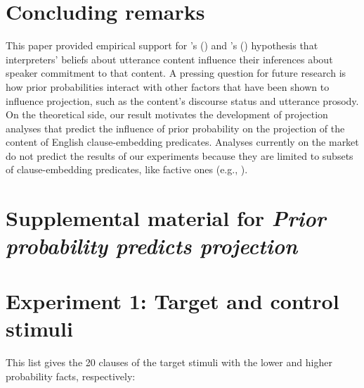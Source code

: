 \documentclass[11pt,fleqn]{article}
\newcommand{\6}{\mbox{$[\hspace*{-.6mm}[$}}
\newcommand{\9}{\mbox{$]\hspace*{-.6mm}]$}}
\newcommand{\citetpos}[1]{\citeauthor{#1}'s (\citeyear{#1})}
\begin{document}
\section{Concluding remarks}\label{s4}

This paper provided empirical support for \citetpos{stevens-etal2017} and \citetpos{tbd-variability} hypothesis that interpreters' beliefs about utterance content influence their inferences about speaker commitment to that content. A pressing question for future research is how prior probabilities interact with other factors that have been shown to influence projection, such as the content's discourse status and utterance prosody. On the theoretical side, our result motivates the development of projection analyses that predict the influence of prior probability on the projection of the content of English clause-embedding predicates. Analyses currently on the market do not predict the results of our experiments  because they are limited to subsets of clause-embedding predicates, like factive ones (e.g., \citealt{heim83,vds92,abrusan2011,abrusan2016,romoli2015,best-question}).






\newpage

\appendix

\setcounter{table}{0}
\renewcommand{\thetable}{A\arabic{table}}

\setcounter{figure}{0}
\renewcommand{\thefigure}{A\arabic{figure}}

\section*{Supplemental material for {\em Prior probability predicts projection}}

\section{Experiment 1: Target and control stimuli}\label{a-stim}

This list gives the 20 clauses of the target stimuli with the lower and higher probability facts, respectively:
\end{document}
